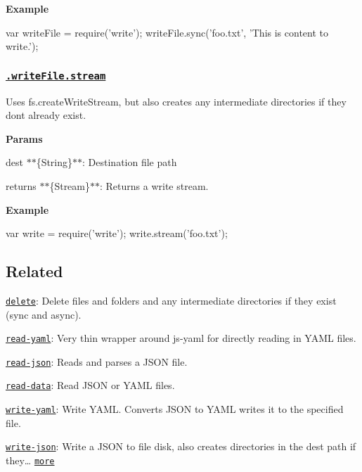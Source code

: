 {\bfseries Example}


\begin{DoxyCode}
var writeFile = require('write');
writeFile.sync('foo.txt', 'This is content to write.');
\end{DoxyCode}


\subsubsection*{\href{index.js#L87}{\tt .write\+File.\+stream}}

Uses {\ttfamily fs.\+create\+Write\+Stream}, but also creates any intermediate directories if they don\textquotesingle{}t already exist.

{\bfseries Params}


\begin{DoxyItemize}
\item {\ttfamily dest} $\ast$$\ast$\{String\}$\ast$$\ast$\+: Destination file path
\item {\ttfamily returns} $\ast$$\ast$\{Stream\}$\ast$$\ast$\+: Returns a write stream.
\end{DoxyItemize}

{\bfseries Example}


\begin{DoxyCode}
var write = require('write');
write.stream('foo.txt');
\end{DoxyCode}


\subsection*{Related}


\begin{DoxyItemize}
\item \href{https://github.com/jonschlinkert/delete}{\tt delete}\+: Delete files and folders and any intermediate directories if they exist (sync and async).
\item \href{https://github.com/jonschlinkert/read-yaml}{\tt read-\/yaml}\+: Very thin wrapper around js-\/yaml for directly reading in Y\+A\+ML files.
\item \href{https://github.com/azer/read-json}{\tt read-\/json}\+: Reads and parses a J\+S\+ON file.
\item \href{https://github.com/jonschlinkert/read-data}{\tt read-\/data}\+: Read J\+S\+ON or Y\+A\+ML files.
\item \href{https://github.com/jonschlinkert/write-yaml}{\tt write-\/yaml}\+: Write Y\+A\+ML. Converts J\+S\+ON to Y\+A\+ML writes it to the specified file.
\item \href{https://github.com/jonschlinkert/write-json}{\tt write-\/json}\+: Write a J\+S\+ON to file disk, also creates directories in the dest path if they… \href{https://github.com/jonschlinkert/write-json}{\tt more}
\end{DoxyItemize}

